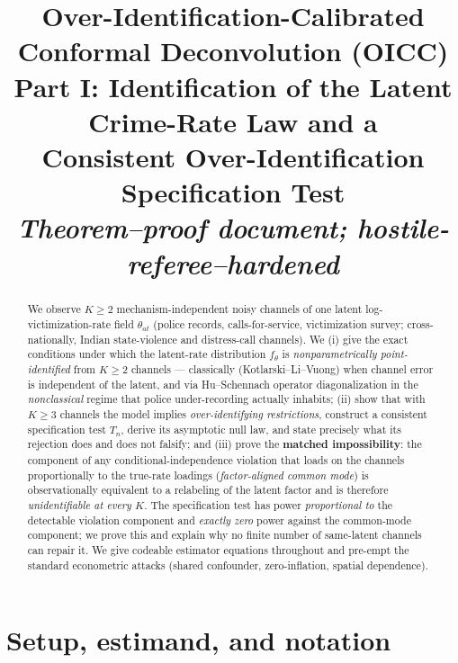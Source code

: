 \documentclass[11pt]{article}
\title{\textbf{Over-Identification-Calibrated Conformal Deconvolution (OICC)}\\[2pt]
\large Part I: Identification of the Latent Crime-Rate Law and a\\
Consistent Over-Identification Specification Test\\[4pt]
\normalsize\emph{Theorem--proof document; hostile-referee--hardened}}
\author{}
\date{}
\theoremstyle{definition}
\newcommand{\Th}{\theta}
\newcommand{\lat}{\Th}
\begin{document}
\maketitle

\begin{abstract}
We observe $K\ge 2$ mechanism-independent noisy channels of one latent
log-victimization-rate field $\lat_{at}$ (police records, calls-for-service,
victimization survey; cross-nationally, Indian state-violence and
distress-call channels). We (i) give the exact conditions under which the
latent-rate distribution $f_{\lat}$ is \emph{nonparametrically point-identified}
from $K\ge 2$ channels --- classically (Kotlarski--Li--Vuong) when channel
error is independent of the latent, and via Hu--Schennach operator
diagonalization in the \emph{nonclassical} regime that police under-recording
actually inhabits; (ii) show that with $K\ge 3$ channels the model implies
\emph{over-identifying restrictions}, construct a consistent specification test
$T_n$, derive its asymptotic null law, and state precisely what its rejection
does and does not falsify; and (iii) prove the \textbf{matched impossibility}:
the component of any conditional-independence violation that loads on the
channels proportionally to the true-rate loadings (\emph{factor-aligned
common mode}) is observationally equivalent to a relabeling of the latent
factor and is therefore \emph{unidentifiable at every $K$}. The specification
test has power \emph{proportional to} the detectable violation component and
\emph{exactly zero} power against the common-mode component; we prove this and
explain why no finite number of same-latent channels can repair it. We give
codeable estimator equations throughout and pre-empt the standard
econometric attacks (shared confounder, zero-inflation, spatial dependence).
\end{abstract}

\tableofcontents

\section{Setup, estimand, and notation}
\end{document}
